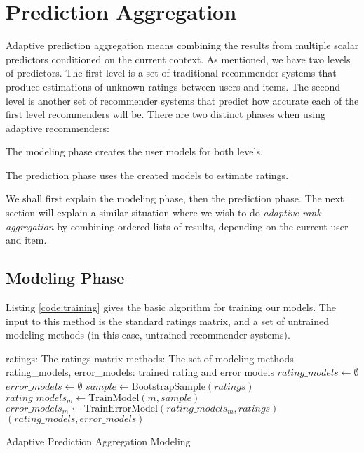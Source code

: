 \section{Prediction Aggregation}

Adaptive prediction aggregation means combining the results
from multiple scalar predictors conditioned on the current context.
As mentioned, we have two levels of predictors.
The first level is a set of traditional recommender systems
that produce estimations of unknown ratings between users and items.
The second level is another set of recommender systems 
that predict how accurate each of the first level recommenders will be.
There are two distinct phases when using adaptive recommenders:

\begin{enumerate*}
  \item The modeling phase creates the user models for both levels.
  \item The prediction phase uses the created models to estimate ratings.
\end{enumerate*}

We shall first explain the modeling phase, then the prediction phase.
The next section will explain a similar situation where
we wish to do \emph{adaptive rank aggregation} by 
combining ordered lists of results, depending on the current user and item.


\subsection{Modeling Phase}

Listing \ref{code:training} gives the basic algorithm for training
our models. The input to this method is the standard ratings matrix,
and a set of untrained modeling methods (in this case,
untrained recommender systems).

\begin{algorithm}
  \begin{algorithmic}[1]
  \REQUIRE ratings: The ratings matrix
  \REQUIRE methods: The set of modeling methods
  \ENSURE  rating\_models, error\_models: trained rating and error models 
    \STATE $rating\_models \gets \emptyset$
    \STATE $error\_models \gets \emptyset$
      \STATE $sample \gets \mathrm{BootstrapSample}(ratings)$
      \STATE $rating\_models_m \gets \mathrm{TrainModel}(m, sample)$
      \STATE $error\_models_m  \gets \mathrm{TrainErrorModel}(rating\_models_m, ratings)$
    \ENDFOR 
  \RETURN $(rating\_models, error\_models)$
  \end{algorithmic}
  \caption[Adaptive Prediction Aggregation Modeling]{Adaptive Prediction Aggregation Modeling
  }
  \label{code:training}
\end{algorithm}

